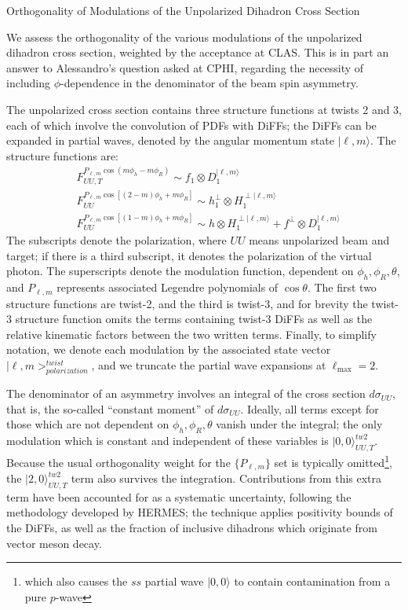 \documentclass[12pt]{article}
\begin{document}
\begin{center}
{\LARGE 
Orthogonality of Modulations of the Unpolarized Dihadron Cross Section
}
\end{center}


We assess the orthogonality of the various modulations of the unpolarized
dihadron cross section, weighted by the acceptance at CLAS. This is in part an
answer to Alessandro's question asked at CPHI, regarding the necessity of including
$\phi$-dependence in the denominator of the beam spin asymmetry.

The unpolarized
cross section contains three structure functions at twists 2 and 3, each of
which involve the convolution of PDFs with DiFFs; the DiFFs can be expanded in
partial waves, denoted by the angular momentum state $|\ell,m\rangle$. The
structure functions are:
\begin{align}
&F_{UU,T}^{P_{\ell,m}\cos\left(m\phi_h-m\phi_R\right)}
  \sim f_1\otimes D_1^{|\ell,m\rangle}\\
&F_{UU}^{P_{\ell,m}\cos\left[(2-m)\phi_h+m\phi_R\right]}
  \sim h_1^{\perp}\otimes H_1^{\perp|\ell,m\rangle}\\
&F_{UU}^{P_{\ell,m}\cos\left[(1-m)\phi_h+m\phi_R\right]}
  \sim h\otimes H_1^{\perp|\ell,m\rangle}+
       f^{\perp}\otimes D_1^{|\ell,m\rangle}
\end{align}
The subscripts denote the polarization, where $UU$ means unpolarized beam and
target; if there is a third subscript, it denotes the polarization of the
virtual photon. The superscripts denote the modulation function, dependent on
$\phi_h,\phi_R,\theta$, and $P_{\ell,m}$ represents associated Legendre
polynomials of $\cos\theta$. The first two structure functions are twist-2, and
the third is twist-3, and for brevity the twist-3 structure function omits the
terms containing twist-3 DiFFs as well as the relative kinematic factors between
the two written terms. Finally, to simplify notation, we denote each modulation
by the associated state vector $|\ell,m>_{polarization}^{twist}$, and we
truncate the partial wave expansions at $\ell_{\text{max}}=2$.

The denominator of an asymmetry involves an integral of the cross section
$d\sigma_{UU}$, that is, the so-called ``constant moment'' of $d\sigma_{UU}$.
Ideally, all terms except for those which are not dependent on
$\phi_h,\phi_R,\theta$ vanish under the integral; the only modulation which is
constant and independent of these variables is $|0,0\rangle_{UU,T}^{tw2}$. Because the
usual orthogonality weight for the $\{P_{\ell,m}\}$ set is typically
omitted\footnote{which also causes the $ss$ partial wave $|0,0\rangle$ to contain
contamination from a pure $p$-wave}, the $|2,0\rangle_{UU,T}^{tw2}$ term also
survives the integration. Contributions from this extra term have been accounted
for as a systematic uncertainty, following the methodology developed by HERMES;
the technique applies positivity bounds of the DiFFs, as well as the fraction of
inclusive dihadrons which originate from vector meson decay.
\end{document}
